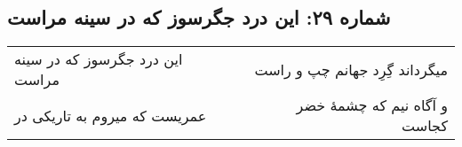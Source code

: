 \begin{center}
\section*{شماره ۲۹: این درد جگرسوز که در سینه مراست}
\label{sec:029}
\begin{longtable}{l p{0.5cm} r}
این درد جگرسوز که در سینه مراست
&&
میگرداند گِرِد جهانم چپ و راست
\\
عمریست که میروم به تاریکی در
&&
و آگاه نیم که چشمهٔ خضر کجاست
\\
\end{longtable}
\end{center}
